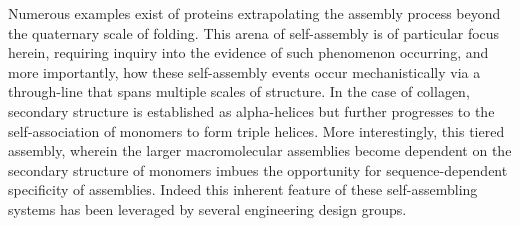 \begin{refsection}
Numerous examples exist of proteins extrapolating the assembly process beyond
the quaternary scale of folding. This arena of self-assembly is of particular
focus herein, requiring inquiry into the evidence of such phenomenon occurring,
and more importantly, how these self-assembly events occur mechanistically via a
through-line that spans multiple scales of structure. In the case of collagen,
secondary structure is established as alpha-helices but further progresses to
the self-association of monomers to form triple helices.  More interestingly,
this tiered assembly, wherein the larger macromolecular assemblies become
dependent on the secondary structure of monomers imbues the opportunity for
sequence-dependent specificity of assemblies. Indeed this inherent feature of
these self-assembling systems has been leveraged by several engineering design
groups.\cite{Kar2009,Stahl2010a,Fletcher2012}


\end{refsection}
